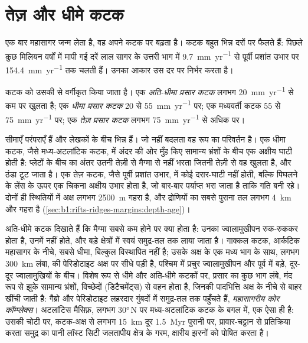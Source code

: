 \section{तेज़ और धीमे कटक}

एक बार महासागर जन्म लेता है, वह अपने कटक पर बढ़ता है। कटक बहुत भिन्न दरों पर फैलते हैं: पिछले कुछ मिलियन वर्षों में मापी गई दरें लाल सागर के उत्तरी भाग में \qty{9.7}{mm.yr^{-1}} से पूर्वी प्रशांत उभार पर \qty{154.4}{mm.yr^{-1}} तक चलती हैं। उनका आकार उस दर पर निर्भर करता है।

\begin{definition}[तेज़-, धीमे- और अति-धीमे-प्रसार कटक]\label{def:b1:rifts-ridges-margins:ridge-classes}
कटक को उसकी  से वर्गीकृत किया जाता है। एक \emph{अति-धीमा प्रसार कटक} लगभग \qty{20}{mm.yr^{-1}} से कम पर खुलता है; एक \emph{धीमा प्रसार कटक} 20 से \qty{55}{mm.yr^{-1}} पर; एक मध्यवर्ती कटक 55 से \qty{75}{mm.yr^{-1}} पर; एक \emph{तेज़ प्रसार कटक} लगभग \qty{75}{mm.yr^{-1}} से अधिक पर।
\end{definition}

सीमाएँ परंपराएँ हैं और लेखकों के बीच भिन्न हैं। जो नहीं बदलता वह रूप का परिवर्तन है। एक धीमा कटक, जैसे मध्य-अटलांटिक कटक, में अंदर की ओर मुँह किए सामान्य भ्रंशों के बीच एक अक्षीय घाटी होती है: प्लेटों के बीच का अंतर उतनी तेज़ी से मैग्मा से नहीं भरता जितनी तेज़ी से वह खुलता है, और ठंडा  टूट जाता है। एक तेज़ कटक, जैसे पूर्वी प्रशांत उभार, में कोई दरार-घाटी नहीं होती, बल्कि पिघलने के लेंस के ऊपर एक चिकना अक्षीय उभार होता है, जो बार-बार पर्याप्त भरा जाता है ताकि गति बनी रहे। दोनों ही स्थितियों में अक्ष लगभग \qty{2500}{m} गहरा है, और द्रोणियों का सबसे पुराना तल लगभग \qty{4}{km} और गहरा है (\cref{sec:b1:rifts-ridges-margins:depth-age})।

अति-धीमे कटक दिखाते हैं कि मैग्मा सबसे कम होने पर क्या होता है: उनका ज्वालामुखीपन रुक-रुककर होता है, उनमें  नहीं होते, और बड़े क्षेत्रों में  स्वयं समुद्र-तल तक लाया जाता है। गाक्कल कटक, आर्कटिक महासागर के नीचे, सबसे धीमा, बिल्कुल विस्थापित नहीं है; उसके अक्ष के एक मध्य भाग के साथ, लगभग \qty{300}{km} लंबा,  की पेरिडोटाइट अक्ष पर सीधे पड़ी है, पश्चिम में प्रचुर ज्वालामुखीपन और पूर्व में बड़े, दूर-दूर ज्वालामुखियों के बीच। विशेष रूप से धीमे और अति-धीमे कटकों पर, प्रसार का कुछ भाग लंबे, मंद रूप से झुके सामान्य भ्रंशों, विच्छेदों (डिटैचमेंट्स) से वहन होता है, जिनकी पादभित्ति अक्ष के नीचे से बाहर खींची जाती है: गैब्रो और पेरिडोटाइट लहरदार गुंबदों में समुद्र-तल तक पहुँचते हैं, \emph{महासागरीय कोर कॉम्प्लेक्स}। अटलांटिस मैसिफ़, लगभग \ang{30}\,N पर मध्य-अटलांटिक कटक के बगल में, एक ऐसा ही है: उसकी चोटी पर, कटक-अक्ष से लगभग \qty{15}{km} दूर \qty{1.5}{Myr} पुरानी  पर, प्रावार-चट्टान से प्रतिक्रिया करता समुद्र का पानी लॉस्ट सिटी जलतापीय क्षेत्र के गरम, क्षारीय झरनों को पोषित करता है।

